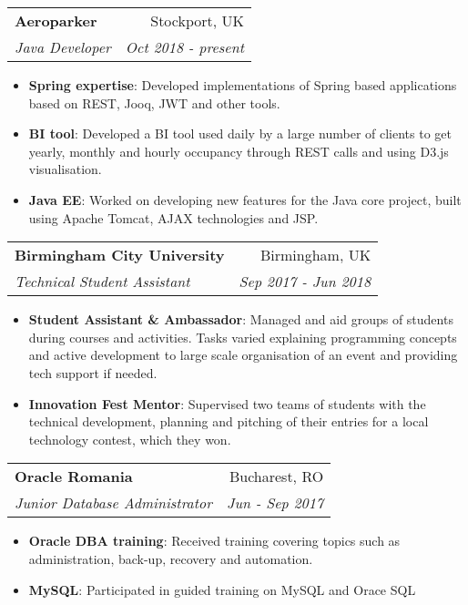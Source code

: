 \documentclass[onesided,12pt]{article}
\makeatletter
\newcommand{\resumeItem}[2]{
  \item\small{
    \textbf{#1}{: #2 \vspace{-2pt}}
  }
}
\newcommand{\resumeSubheading}[4]{
  \vspace{-1pt}\item
    \begin{tabular*}{0.97\textwidth}[t]{l@{\extracolsep{\fill}}r}
      \textbf{#1} & #2 \\
      \textit{\small#3} & \textit{\small #4} \\
    \end{tabular*}\vspace{-5pt}
}
\newcommand{\resumeItemListStart}{\begin{itemize}}
\newcommand{\resumeItemListEnd}{\end{itemize}\vspace{-5pt}}
\makeatother
\begin{document}
  \resumeSubheading
    {Aeroparker}{Stockport, UK}
    {Java Developer}{Oct 2018 - present}
      \resumeItemListStart
        \resumeItem{Spring expertise}
            {Developed implementations of Spring based applications based on REST, Jooq, JWT and other tools. }
        \resumeItem{BI tool}
            { Developed a BI tool used daily by a large number of clients to get yearly, monthly and hourly occupancy through REST calls and using D3.js visualisation.}
        \resumeItem{Java EE}
            { Worked on developing new features for the Java core project, built using Apache Tomcat, AJAX technologies and JSP.}
          
      \resumeItemListEnd
      
    
    \resumeSubheading
    {Birmingham City University}{Birmingham, UK}
    {Technical Student Assistant}{Sep 2017 - Jun 2018}
      \resumeItemListStart
        \resumeItem{Student Assistant \& Ambassador}
          {Managed and aid groups of students during courses and activities. Tasks varied explaining programming concepts and active development to large scale organisation of an event and providing tech support if needed. }
        \resumeItem{Innovation Fest Mentor}
          {Supervised two teams of students with the technical development, planning and pitching of their entries for a local technology contest, which they won. }
      \resumeItemListEnd

    \resumeSubheading
    {Oracle Romania}{Bucharest, RO}
    {Junior Database Administrator}{Jun - Sep 2017}
      \resumeItemListStart
        \resumeItem{Oracle DBA training}
          {Received training covering topics such as administration, back-up, recovery and automation.}
        \resumeItem{MySQL}
          {Participated in guided training on MySQL and Orace SQL}
      \resumeItemListEnd
      
    
      
\end{document}
